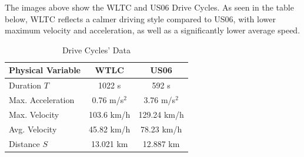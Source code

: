 	The images above show the WLTC and US06 Drive Cycles. As seen in the table below, WLTC reflects a calmer driving style compared to US06, with lower maximum velocity and acceleration, as well as a significantly lower average speed. 
	\begin{table}[H]
		\begin{center}
			\begin{tabular}{l | c | c}
					\hline\hline
				Physical Variable			& WTLC & US06 \\
					\hline\hline
				Duration $T$ 		& 1022 s & 592 s\\
				Max. Acceleration& 0.76 m/s$^2$& 3.76 m/s$^2$ \\
				Max. Velocity	& 103.6 km/h& 129.24 km/h\\
				Avg. Velocity 	& 45.82 km/h & 78.23 km/h\\
				Distance $S$ 		& 13.021 km & 12.887 km \\
				\hline\hline
			\end{tabular}
		\end{center}
		\caption{Drive Cycles' Data}
		\label{tab: drive_cycle}
	\end{table}